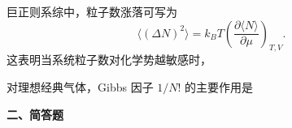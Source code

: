 \begin{question}
巨正则系综中，粒子数涨落可写为
\[
\langle (\Delta N)^2\rangle = k_B T\left(\frac{\partial \langle N\rangle}{\partial \mu}\right)_{T,V}.
\]
这表明当系统粒子数对化学势越敏感时，
\begin{choiceoptions}[2]
\end{choiceoptions}

\begin{solution}
\end{solution}
\end{question}
\begin{question}
对理想经典气体，Gibbs 因子 $1/N!$ 的主要作用是
\begin{choiceoptions}[2]
\end{choiceoptions}

\begin{solution}
\end{solution}
\end{question}
\textbf{二、简答题}

